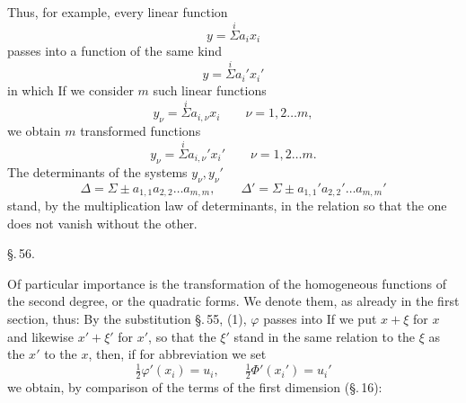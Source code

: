 
Thus, for example, every linear function
\[
y = \overset{i}{\Sigma} a_i x_i
\]
passes into a function of the same kind
\[
y = \overset{i}{\Sigma} a_i' x_i'
\]
in which
If we consider $m$ such linear functions
\[
y_\nu = \overset{i}{\Sigma} a_{i,\nu} x_i \qquad \nu = 1, 2 \ldots m,
\]
we obtain $m$ transformed functions
\[
y_\nu = \overset{i}{\Sigma} a_{i,\nu}' x_i' \qquad \nu = 1, 2 \ldots m.
\]
The determinants of the systems $y_\nu, y_\nu'$
\[
\Delta = \Sigma \pm a_{1,1} a_{2,2} \ldots a_{m,m}, \qquad \Delta' = \Sigma \pm a_{1,1}' a_{2,2}' \ldots a_{m,m}'
\]
stand, by the multiplication law of determinants, in the relation
so that the one does not vanish without the other.

\begin{center}
\S.\,56.

\end{center}

Of particular importance is the transformation of the homogeneous functions of the second degree, or the quadratic forms. We denote them, as already in the first section, thus:
By the substitution \S.\,55, (1), $\varphi$ passes into
If we put $x + \xi$ for $x$ and likewise $x' + \xi'$ for $x'$, so that the $\xi'$ stand in the same relation to the $\xi$ as the $x'$ to the $x$, then, if for abbreviation we set
\[
\tfrac{1}{2}\varphi'(x_i) = u_i, \qquad \tfrac{1}{2}\Phi'(x_i') = u_i'
\]
we obtain, by comparison of the terms of the first dimension (\S.\,16):
